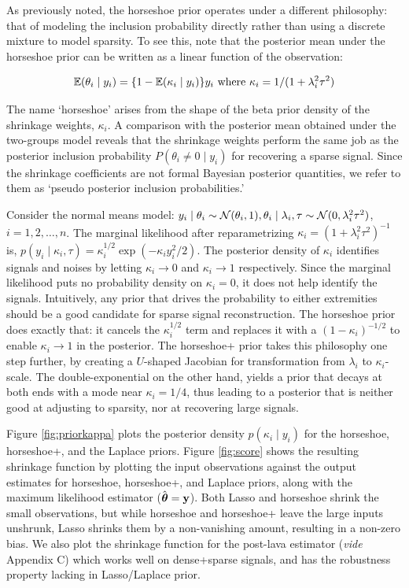 \documentclass[sts,preprint]{imsart}
\begin{document}
As previously noted, the horseshoe prior operates under a different philosophy: that of modeling the inclusion probability directly rather than using a discrete mixture to model sparsity. To see this, note that the posterior mean under the horseshoe prior can be written as a linear function of the observation:

\[
\mathbb E(\theta_i \mid y_i) = \{1- \mathbb E(\kappa_i \mid y_i) \} y_i \text{ where } \kappa_i = 1/(1+\lambda_i^2 \tau^2)
\]

The name `horseshoe' arises from the shape of the beta prior density of the shrinkage weights, $\kappa_i$. A comparison with the posterior mean obtained under the two-groups model reveals that the shrinkage weights perform the same job as the posterior inclusion probability $P(\theta_i \ne 0 \mid y_i)$ for recovering a sparse signal. Since the shrinkage coefficients are not formal Bayesian posterior quantities, we refer to them as `pseudo posterior inclusion probabilities.'

Consider the normal means model: $y_i \mid \theta_i \sim {\cal N}(\theta_i,1), \theta_i \mid \lambda_i, \tau \sim {\cal N}(0, \lambda_i^2 \tau^2)$, $i = 1,2, \ldots, n$. The marginal likelihood after reparametrizing $\kappa_i = (1+\lambda_i^2\tau^2)^{-1}$ is,  $p(y_i \mid \kappa_i, \tau) = \kappa_i^{1/2} \exp \left(-\kappa_i y_i^2/2 \right)$. The posterior density of $\kappa_i$ identifies signals and noises by letting $\kappa_i \to 0$ and $\kappa_i \to 1$ respectively. Since the marginal likelihood puts no probability density on $\kappa_i = 0$, it does not help identify the signals. Intuitively, any prior that drives the probability to either extremities should be a good candidate for sparse signal reconstruction. The horseshoe prior does exactly that: it cancels the $\kappa_i^{1/2}$ term and replaces it with a $(1-\kappa_i)^{-1/2}$ to enable $\kappa_i \to 1$ in the posterior. The horseshoe+ prior \citep{bhadra2015horseshoe+} takes this philosophy one step further, by creating a $U$-shaped Jacobian for transformation from $\lambda_i$ to $\kappa_i$-scale. The double-exponential on the other hand, yields a prior that decays at both ends with a mode near $\kappa_i = 1/4$, thus leading to a posterior that is neither good at adjusting to sparsity, nor at recovering large signals.
 
Figure \ref{fig:priorkappa} plots the posterior density $p(\kappa_i \mid y_i)$ for the horseshoe, horseshoe+, and the Laplace priors. Figure \ref{fig:score} shows the resulting shrinkage function by plotting the input observations against the output estimates for horseshoe, horseshoe+, and Laplace priors, along with the maximum likelihood estimator ($\hat{\boldsymbol{\theta}} = {\bf y}$). Both Lasso and horseshoe shrink the small observations, but while horseshoe and horseshoe+ leave the large inputs unshrunk, Lasso shrinks them by a non-vanishing amount, resulting in a non-zero bias. We also plot the shrinkage function for the post-lava estimator \citep{chernozhukov2017lava} (\textit{vide} Appendix C) which works well on dense+sparse signals, and has the robustness property lacking in Lasso/Laplace prior. 
\end{document}
